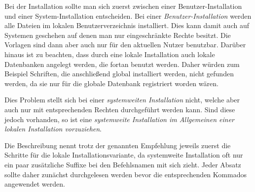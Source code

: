Bei der Installation sollte man sich zuerst zwischen einer Benutzer-Installation
und einer System-Installation entscheiden.
Bei einer \emph{Benutzer-Installation} werden alle Dateien im lokalen Benutzerverzeichnis installiert.
Dies kann damit auch auf Systemen geschehen auf denen man nur
eingeschränkte Rechte besitzt.
Die Vorlagen sind dann aber auch nur für den aktuellen Nutzer benutzbar.
Darüber hinaus ist zu beachten, dass durch eine lokale Installation auch
lokale Datenbanken angelegt werden, die fortan benutzt werden.
Daher würden zum Beispiel Schriften, die anschließend global installiert werden,
nicht gefunden werden, da sie nur für die globale Datenbank registriert worden wären.

Dies Problem stellt sich bei einer \emph{systemweiten Installation} nicht,
welche aber auch nur mit entsprechenden Rechten durchgeführt werden kann.
Sind diese jedoch vorhanden, so ist eine \emph{systemweite Installation im
Allgemeinen einer lokalen Installation vorzuziehen}.

\begin{important}
Die Beschreibung nennt trotz der genannten Empfehlung jeweils zuerst die
Schritte für die lokale Installationsvariante, da systemweite Installation
oft nur ein paar zusätzliche Suffixe bei den Befehlsnamen mit sich zieht.
Jeder Absatz sollte daher zunächst durchgelesen werden bevor die entsprechenden
Kommados angewendet werden.
\end{important}


